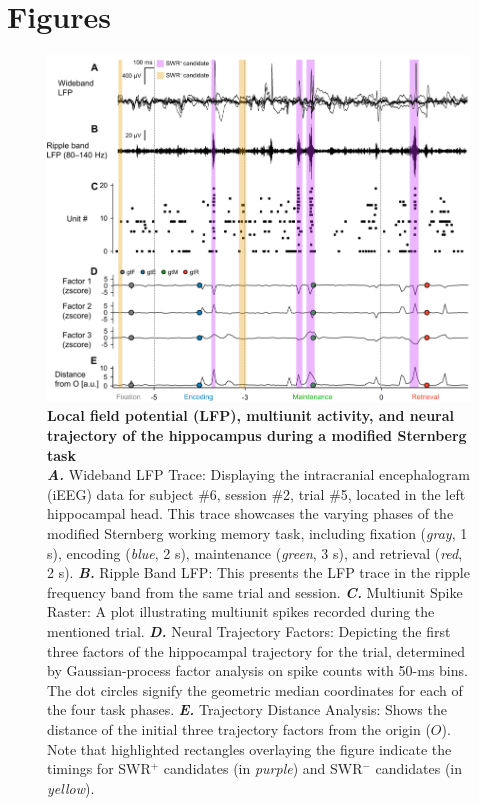 \documentclass[final,3p,times,twocolumn]{elsarticle}
\begin{document}
\clearpage
\section*{Figures}
\label{figures}
        \clearpage
        \begin{figure}[ht]
        	\centering
            \includegraphics[width=1\textwidth]{./src/figures/.png/Figure_ID_01.png}
        	\caption{\textbf{
Local field potential (LFP), multiunit activity, and neural trajectory of the hippocampus during a modified Sternberg task
}
\smallskip
\\
\textbf{\textit{A.}} Wideband LFP Trace: Displaying the intracranial encephalogram (iEEG) data for subject \#6, session \#2, trial \#5, located in the left hippocampal head. This trace showcases the varying phases of the modified Sternberg working memory task, including fixation (\textit{gray}, 1 s), encoding (\textit{blue}, 2 s), maintenance (\textit{green}, 3 s), and retrieval (\textit{red}, 2 s). \textbf{\textit{B.}} Ripple Band LFP: This presents the LFP trace in the ripple frequency band from the same trial and session. \textbf{\textit{C.}} Multiunit Spike Raster: A plot illustrating multiunit spikes recorded during the mentioned trial. \textbf{\textit{D.}} Neural Trajectory Factors: Depicting the first three factors of the hippocampal trajectory for the trial, determined by Gaussian-process factor analysis on spike counts with 50-ms bins. The dot circles signify the geometric median coordinates for each of the four task phases. \textbf{\textit{E.}} Trajectory Distance Analysis: Shows the distance of the initial three trajectory factors from the origin ($O$). Note that highlighted rectangles overlaying the figure indicate the timings for SWR$^+$ candidates (in \textit{purple}) and SWR$^-$ candidates (in \textit{yellow}).
}
        	\label{fig:01}
        \end{figure}
\end{document}
